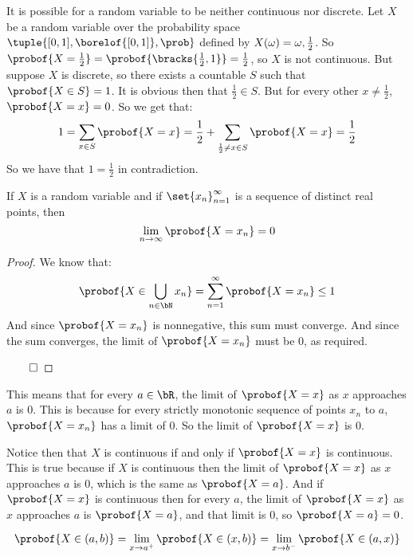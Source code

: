 \begin{exam}

	It is possible for a random variable to be neither continuous nor discrete.
	Let $X$ be a random variable over the probability space $\tuple{[0,1],\borelof{[0,1]},\prob}$
	defined by $X(\omega)=\minof{\omega,\frac12}$.
	So $\probof{X=\frac12}=\probof{\bracks{\frac12,1}}=\frac12$, so $X$ is not continuous.
	But suppose $X$ is discrete, so there exists a countable $S$ such that $\probof{X\in S}=1$.
	It is obvious then that $\frac12\in S$.
	But for every other $x\neq\frac12$, $\probof{X=x}=0$.
	So we get that:
	\[ 1 = \sum_{x\in S}\probof{X=x} = \frac12+\sum_{\frac12\neq x\in S}\probof{X=x} = \frac12 \]
	So we have that $1=\frac12$ in contradiction.

\end{exam}

\begin{lemm*}

	If $X$ is a random variable and if $\set{x_n}_{n=1}^\infty$ is a sequence of distinct real points, then
	\[ \lim_{n\to\infty}\probof{X=x_n} = 0 \]

\end{lemm*}

\begin{proof}

	We know that:
	\[ \probof{X\in\bigcup_{n\in\bN}x_n} = \sum_{n=1}^\infty\probof{X=x_n} \leq 1\]
	And since $\probof{X=x_n}$ is nonnegative, this sum must converge.
	And since the sum converges, the limit of $\probof{X=x_n}$ must be $0$, as required.

	\hfill$\qed$

\end{proof}

This means that for every $a\in\bR$, the limit of $\probof{X=x}$ as $x$ approaches $a$ is $0$.
This is because for every strictly monotonic sequence of points $x_n$ to $a$, $\probof{X=x_n}$ has a limit of $0$.
So the limit of $\probof{X=x}$ is $0$.

Notice then that $X$ is continuous if and only if $\probof{X=x}$ is continuous.
This is true because if $X$ is continuous then the limit of $\probof{X=x}$ as $x$ approaches $a$ is $0$, which is the
same as $\probof{X=a}$.
And if $\probof{X=x}$ is continuous then for every $a$, the limit of $\probof{X=x}$ as $x$ approaches $a$ is
$\probof{X=a}$, and that limit is $0$, so $\probof{X=a}=0$.

\begin{prop*}

	\[ \probof{X\in(a,b)} = \lim_{x\to a^+}\probof{X\in(x,b)} = \lim_{x\to b^-}\probof{X\in(a,x)} \]

\end{prop*}

